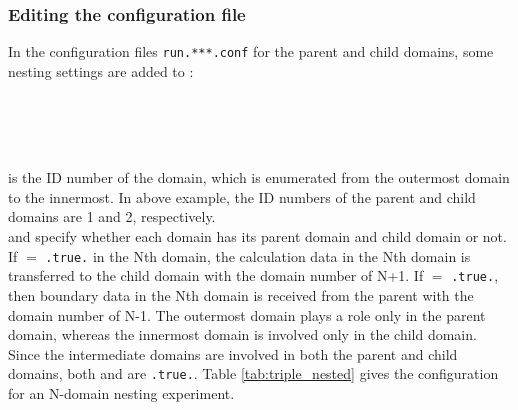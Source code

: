 \subsubsection{Editing the configuration file}
In the configuration files \verb|run.***.conf| for the parent and child domains, some nesting settings are added to :

\\
~\\
\\

 is the ID number of the domain, which is enumerated from the outermost domain to the innermost.
In above example, the ID numbers of the parent and child domains are 1 and 2, respectively.\\
 and  specify whether each domain has its parent domain and child domain or not.
If  $=$ \verb|.true.| in the Nth domain, the calculation data in the Nth domain is transferred to the child domain with the domain number of N+1.
If  $=$ \verb|.true.|, then boundary data in the Nth domain is received from the parent with the domain number of N-1.
The outermost domain plays a role only in the parent domain, whereas the innermost domain is involved only in the child domain.
Since the intermediate domains are involved in both the parent and child domains, both  and  are \verb|.true.|.
Table \ref{tab:triple_nested} gives the configuration for an N-domain nesting experiment.

